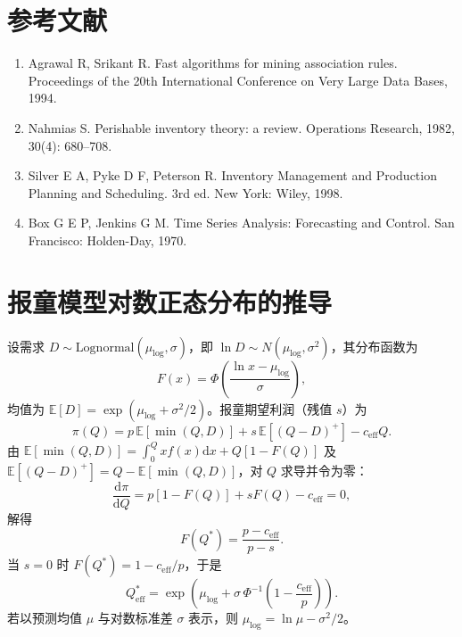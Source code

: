 \documentclass[12pt]{ctexart}
\begin{document}
\section*{参考文献}
\begin{enumerate}
\item Agrawal R, Srikant R. Fast algorithms for mining association rules. Proceedings of the 20th International Conference on Very Large Data Bases, 1994.
\item Nahmias S. Perishable inventory theory: a review. Operations Research, 1982, 30(4): 680--708.
\item Silver E A, Pyke D F, Peterson R. Inventory Management and Production Planning and Scheduling. 3rd ed. New York: Wiley, 1998.
\item Box G E P, Jenkins G M. Time Series Analysis: Forecasting and Control. San Francisco: Holden-Day, 1970.
\end{enumerate}

\appendix
\section{报童模型对数正态分布的推导}

设需求 $D\sim\mathrm{Lognormal}(\mu_{\log},\sigma)$，即 $\ln D\sim N(\mu_{\log},\sigma^2)$，其分布函数为
\begin{equation}
F(x) = \Phi\!\left(\frac{\ln x-\mu_{\log}}{\sigma}\right),
\end{equation}
均值为 $\mathbb{E}[D]=\exp(\mu_{\log}+\sigma^2/2)$。报童期望利润（残值 $s$）为
\begin{equation}
\pi(Q) = p\,\mathbb{E}[\min(Q,D)] + s\,\mathbb{E}[(Q-D)^+] - c_{\mathrm{eff}} Q.
\end{equation}
由 $\mathbb{E}[\min(Q,D)]=\int_0^Q x f(x)\mathrm{d}x + Q[1-F(Q)]$ 及 $\mathbb{E}[(Q-D)^+] = Q-\mathbb{E}[\min(Q,D)]$，对 $Q$ 求导并令为零：
\begin{equation}
\frac{\mathrm{d}\pi}{\mathrm{d}Q} = p[1-F(Q)] + s F(Q) - c_{\mathrm{eff}} = 0,
\end{equation}
解得
\begin{equation}
F(Q^*) = \frac{p-c_{\mathrm{eff}}}{p-s}.
\end{equation}
当 $s=0$ 时 $F(Q^*)=1-c_{\mathrm{eff}}/p$，于是
\begin{equation}
Q_{\mathrm{eff}}^* = \exp\!\left(\mu_{\log} + \sigma\,\Phi^{-1}\!\left(1-\frac{c_{\mathrm{eff}}}{p}\right)\right).
\end{equation}
若以预测均值 $\mu$ 与对数标准差 $\sigma$ 表示，则 $\mu_{\log}=\ln\mu-\sigma^2/2$。
\end{document}
